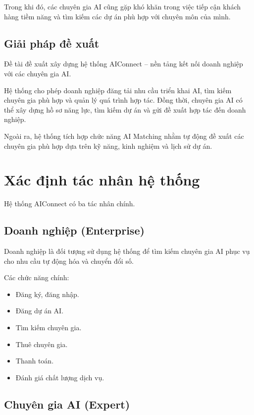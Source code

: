 Trong khi đó, các chuyên gia AI cũng gặp khó khăn trong việc tiếp cận khách hàng tiềm năng và tìm kiếm các dự án phù hợp với chuyên môn của mình.

\subsection{Giải pháp đề xuất}

Đề tài đề xuất xây dựng hệ thống AIConnect – nền tảng kết nối doanh nghiệp với các chuyên gia AI.

Hệ thống cho phép doanh nghiệp đăng tải nhu cầu triển khai AI, tìm kiếm chuyên gia phù hợp và quản lý quá trình hợp tác. Đồng thời, chuyên gia AI có thể xây dựng hồ sơ năng lực, tìm kiếm dự án và gửi đề xuất hợp tác đến doanh nghiệp.

Ngoài ra, hệ thống tích hợp chức năng AI Matching nhằm tự động đề xuất các chuyên gia phù hợp dựa trên kỹ năng, kinh nghiệm và lịch sử dự án.

\section{Xác định tác nhân hệ thống}

Hệ thống AIConnect có ba tác nhân chính.

\subsection{Doanh nghiệp (Enterprise)}

Doanh nghiệp là đối tượng sử dụng hệ thống để tìm kiếm chuyên gia AI phục vụ cho nhu cầu tự động hóa và chuyển đổi số.

Các chức năng chính:

\begin{itemize}
    \item Đăng ký, đăng nhập.
    \item Đăng dự án AI.
    \item Tìm kiếm chuyên gia.
    \item Thuê chuyên gia.
    \item Thanh toán.
    \item Đánh giá chất lượng dịch vụ.
\end{itemize}

\subsection{Chuyên gia AI (Expert)}

